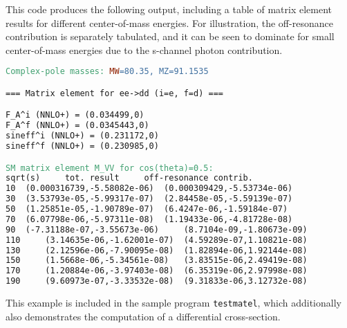 \documentclass[12pt]{article}
\begin{document}
\noindent
This code produces the following output, including a table of matrix element results for different center-of-mass energies. For illustration, the off-resonance contribution is separately tabulated, and it can be seen to dominate for small center-of-mass energies due to the s-channel photon contribution.

\begin{lstlisting}[language=make]
Complex-pole masses: MW=80.35, MZ=91.1535

=== Matrix element for ee->dd (i=e, f=d) ===

F_A^i (NNLO+) = (0.034499,0)
F_A^f (NNLO+) = (0.0345443,0)
sineff^i (NNLO+) = (0.231172,0)
sineff^f (NNLO+) = (0.230985,0)

SM matrix element M_VV for cos(theta)=0.5: 
sqrt(s)		tot. result		off-resonance contrib.
10 	(0.000316739,-5.58082e-06) 	(0.000309429,-5.53734e-06)
30 	(3.53793e-05,-5.99317e-07) 	(2.84458e-05,-5.59139e-07)
50 	(1.25851e-05,-1.90789e-07) 	(6.4247e-06,-1.59184e-07)
70 	(6.07798e-06,-5.97311e-08) 	(1.19433e-06,-4.81728e-08)
90 	(-7.31188e-07,-3.55673e-06) 	(8.7104e-09,-1.80673e-09)
110 	(3.14635e-06,-1.62001e-07) 	(4.59289e-07,1.10821e-08)
130 	(2.12596e-06,-7.90095e-08) 	(1.82894e-06,1.92144e-08)
150 	(1.5668e-06,-5.34561e-08) 	(3.83515e-06,2.49419e-08)
170 	(1.20884e-06,-3.97403e-08) 	(6.35319e-06,2.97998e-08)
190 	(9.60973e-07,-3.33532e-08) 	(9.31833e-06,3.12732e-08)
\end{lstlisting}

\noindent 
This example is included in the sample program {\tt testmatel}, which additionally also demonstrates the computation of a differential cross-section.

{}

\end{document}
